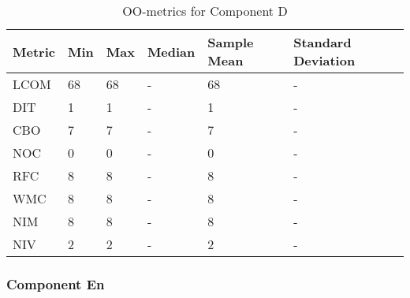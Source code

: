 \begin{table}[]
\centering
\caption{OO-metrics for Component D}
\label{tab:oometrics-dist}
\begin{tabular}{|l|l|l|l|l|l|}
\hline
\textbf{Metric} & \textbf{Min} & \textbf{Max} & \textbf{Median} & \textbf{Sample Mean} & \textbf{Standard Deviation} \\ \hline
LCOM            & 68           & 68           & -               & 68                   & -                           \\ \hline
DIT             & 1            & 1            & -               & 1                    & -                           \\ \hline
CBO             & 7            & 7            & -               & 7                    & -                           \\ \hline
NOC             & 0            & 0            & -               & 0                    & -                           \\ \hline
RFC             & 8            & 8            & -               & 8                    & -                           \\ \hline
WMC             & 8            & 8            & -               & 8                    & -                           \\ \hline
NIM             & 8            & 8            & -               & 8                    & -                           \\ \hline
NIV             & 2            & 2            & -               & 2                    & -                           \\ \hline
\end{tabular}
\end{table}






\subsubsection{Component En}

